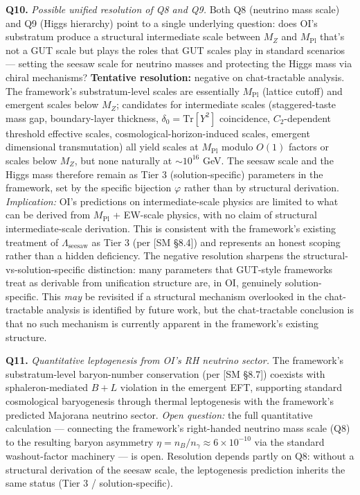 \documentclass[
]{article}
\begin{document}
\textbf{Q10.} \emph{Possible unified resolution of Q8 and Q9.} Both Q8
(neutrino mass scale) and Q9 (Higgs hierarchy) point to a single
underlying question: does OI's substratum produce a structural
intermediate scale between \(M_Z\) and \(M_{\mathrm{Pl}}\) that's not a
GUT scale but plays the roles that GUT scales play in standard scenarios
--- setting the seesaw scale for neutrino masses and protecting the
Higgs mass via chiral mechanisms? \textbf{Tentative resolution:}
negative on chat-tractable analysis. The framework's substratum-level
scales are essentially \(M_{\mathrm{Pl}}\) (lattice cutoff) and emergent
scales below \(M_Z\); candidates for intermediate scales
(staggered-taste mass gap, boundary-layer thickness,
\(\delta_0 = \mathrm{Tr}[Y^2]\) coincidence, \(C_2\)-dependent threshold
effective scales, cosmological-horizon-induced scales, emergent
dimensional transmutation) all yield scales at \(M_{\mathrm{Pl}}\)
modulo \(O(1)\) factors or scales below \(M_Z\), but none naturally at
\(\sim 10^{16}\) GeV. The seesaw scale and the Higgs mass therefore
remain as Tier 3 (solution-specific) parameters in the framework, set by
the specific bijection \(\varphi\) rather than by structural derivation.
\emph{Implication:} OI's predictions on intermediate-scale physics are
limited to what can be derived from \(M_{\mathrm{Pl}}\) + EW-scale
physics, with no claim of structural intermediate-scale derivation. This
is consistent with the framework's existing treatment of
\(\Lambda_{\mathrm{seesaw}}\) as Tier 3 (per {[}SM §8.4{]}) and
represents an honest scoping rather than a hidden deficiency. The
negative resolution sharpens the structural-vs-solution-specific
distinction: many parameters that GUT-style frameworks treat as
derivable from unification structure are, in OI, genuinely
solution-specific. This \emph{may} be revisited if a structural
mechanism overlooked in the chat-tractable analysis is identified by
future work, but the chat-tractable conclusion is that no such mechanism
is currently apparent in the framework's existing structure.

\textbf{Q11.} \emph{Quantitative leptogenesis from OI's RH neutrino
sector.} The framework's substratum-level baryon-number conservation
(per {[}SM §8.7{]}) coexists with sphaleron-mediated \(B+L\) violation
in the emergent EFT, supporting standard cosmological baryogenesis
through thermal leptogenesis with the framework's predicted Majorana
neutrino sector. \emph{Open question:} the full quantitative calculation
--- connecting the framework's right-handed neutrino mass scale (Q8) to
the resulting baryon asymmetry
\(\eta = n_B/n_\gamma \approx 6 \times 10^{-10}\) via the standard
washout-factor machinery --- is open. Resolution depends partly on Q8:
without a structural derivation of the seesaw scale, the leptogenesis
prediction inherits the same status (Tier 3 / solution-specific).
\end{document}
